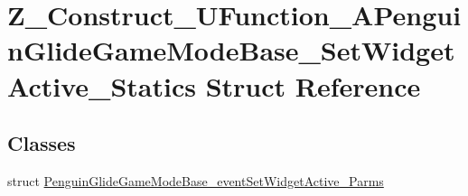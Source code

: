 \hypertarget{struct_z___construct___u_function___a_penguin_glide_game_mode_base___set_widget_active___statics}{}\section{Z\+\_\+\+Construct\+\_\+\+U\+Function\+\_\+\+A\+Penguin\+Glide\+Game\+Mode\+Base\+\_\+\+Set\+Widget\+Active\+\_\+\+Statics Struct Reference}
\label{struct_z___construct___u_function___a_penguin_glide_game_mode_base___set_widget_active___statics}
\subsection*{Classes}
\begin{DoxyCompactItemize}
\item 
struct \mbox{\hyperlink{struct_z___construct___u_function___a_penguin_glide_game_mode_base___set_widget_active___staticsd10a2cb5d52cd0519a2ff107a8270c0c}{Penguin\+Glide\+Game\+Mode\+Base\+\_\+event\+Set\+Widget\+Active\+\_\+\+Parms}}
\end{DoxyCompactItemize}
